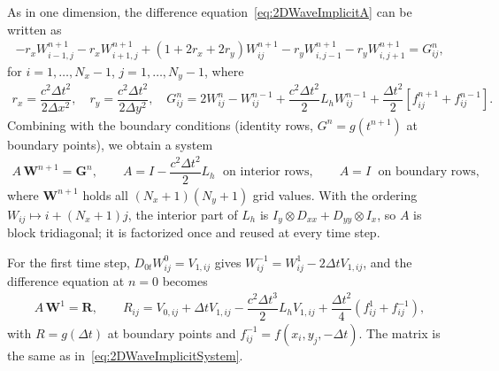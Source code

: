 \documentclass[11pt]{article}
\begin{document}
As in one dimension, the difference equation~\eqref{eq:2DWaveImplicitA} can be written as
\begin{align}
-r_xW_{i-1,j}^{n+1}-r_xW_{i+1,j}^{n+1}+(1+2r_x+2r_y)W_{ij}^{n+1}-r_yW_{i,j-1}^{n+1}-r_yW_{i,j+1}^{n+1}=G_{ij}^n,
\end{align}
for $i=1,\dots,N_x-1$, $j=1,\dots,N_y-1$, where
\begin{align*}
r_x=\dfrac{c^2\Delta t^2}{2\Delta x^2},\quad r_y=\dfrac{c^2\Delta t^2}{2\Delta y^2},\quad G_{ij}^n=2W_{ij}^n-W_{ij}^{n-1}+\dfrac{c^2\Delta t^2}{2} L_hW_{ij}^{n-1}+\dfrac{\Delta t^2}{2}\left[f_{ij}^{n+1}+f_{ij}^{n-1}\right].
\end{align*}
Combining with the boundary conditions (identity rows, $G^n = g(t^{n+1})$ at boundary points), we obtain a system
\begin{align}
\label{eq:2DWaveImplicitSystem}
A\,\mathbf{W}^{n+1} = \mathbf{G}^{n}, \qquad A = I - \dfrac{c^2\Delta t^2}{2}L_h \;\text{ on interior rows}, \qquad A = I \;\text{ on boundary rows},
\end{align}
where $\mathbf{W}^{n+1}$ holds all $(N_x+1)(N_y+1)$ grid values. With the ordering $W_{ij}\mapsto i+(N_x+1)j$, the interior part of $L_h$ is $I_y\otimes D_{xx} + D_{yy}\otimes I_x$, so $A$ is block tridiagonal; it is factorized once and reused at every time step.

For the first time step, $D_{0t}W_{ij}^0=V_{1,ij}$ gives $W_{ij}^{-1}=W_{ij}^1-2\Delta t V_{1,ij}$, and the difference equation at $n=0$ becomes
\begin{align}
A\,\mathbf{W}^{1} = \mathbf{R}, \qquad R_{ij}= V_{0,ij} + \Delta t V_{1,ij} - \dfrac{c^2 \Delta t^3}{2}L_hV_{1,ij} + \dfrac{\Delta t^2}{4}\left(f_{ij}^{1}+f_{ij}^{-1}\right),
\end{align}
with $R=g(\Delta t)$ at boundary points and $f_{ij}^{-1}=f(x_i,y_j,-\Delta t)$. The matrix is the same as in~\eqref{eq:2DWaveImplicitSystem}.
\end{document}
